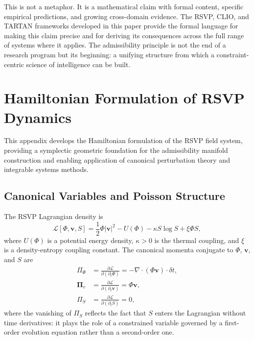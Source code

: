 \documentclass[11pt, oneside]{article}
\numberwithin{equation}{section}
\theoremstyle{rsvpstyle}
\theoremstyle{remark}
\newcommand{\vfield}{\mathbf{v}}
\newcommand{\grad}{\nabla}
\begin{document}
This is not a metaphor. It is a mathematical claim with formal content, specific
empirical predictions, and growing cross-domain evidence. The RSVP, CLIO, and TARTAN
frameworks developed in this paper provide the formal language for making this claim
precise and for deriving its consequences across the full range of systems where it
applies. The admissibility principle is not the end of a research program but its
beginning: a unifying structure from which a constraint-centric science of intelligence
can be built.


\appendix

\section{Hamiltonian Formulation of RSVP Dynamics}
\label{app:hamiltonian}

This appendix develops the Hamiltonian formulation of the RSVP field system, providing
a symplectic geometric foundation for the admissibility manifold construction and
enabling application of canonical perturbation theory and integrable systems methods.

\subsection{Canonical Variables and Poisson Structure}

The RSVP Lagrangian density is
\begin{equation}
  \mathcal{L}[\Phi, \vfield, S] = \frac{1}{2}\Phi |\vfield|^2
  - U(\Phi) - \kappa S \log S + \xi \Phi S,
\end{equation}
where $U(\Phi)$ is a potential energy density, $\kappa > 0$ is the thermal coupling,
and $\xi$ is a density-entropy coupling constant. The canonical momenta conjugate to
$\Phi$, $\vfield$, and $S$ are
\begin{align}
  \Pi_\Phi &= \frac{\partial \mathcal{L}}{\partial (\partial_t \Phi)}
  = -\grad \cdot (\Phi \vfield) \cdot \delta t, \\
  \boldsymbol{\Pi}_v &= \frac{\partial \mathcal{L}}{\partial (\partial_t \vfield)}
  = \Phi \vfield, \\
  \Pi_S &= \frac{\partial \mathcal{L}}{\partial (\partial_t S)} = 0,
\end{align}
where the vanishing of $\Pi_S$ reflects the fact that $S$ enters the Lagrangian
without time derivatives: it plays the role of a constrained variable governed by
a first-order evolution equation rather than a second-order one.
\end{document}
